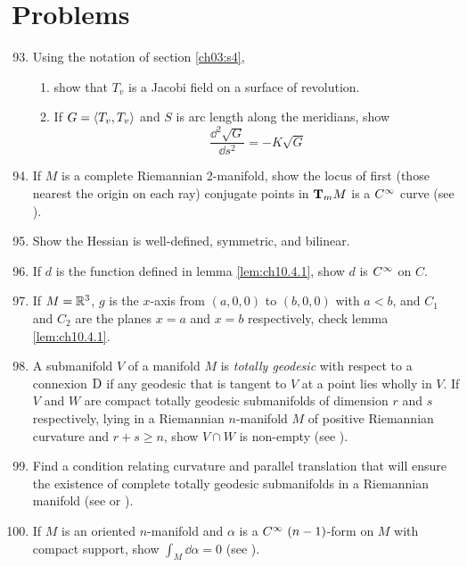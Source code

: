 \documentclass[../main]{subfiles}
\begin{document}
\section*{Problems}
\begin{enumerate}
\setcounter{enumi}{92}

\item\label{pro:93} Using the notation of section \ref{ch03:s4}, \begin{enumerate}
    \item show that $T_v$ is a Jacobi field on a surface of revolution.
    \item If $G=\ip{T_v}{T_v}$ and $S$ is arc length along the meridians, show
\[\frac{\dd^2\sqrt G}{\dd s^2}=-K\sqrt G\]

\end{enumerate} 
\item\label{pro:94} If $M$ is a complete Riemannian 2-manifold, show the locus of first (those nearest the origin on each ray) conjugate points in $\ts Mm$ is a $\CInfty$ curve (see \cite{myers1935connections}).

\item\label{pro:95} Show the Hessian is well-defined, symmetric, and bilinear.

\item\label{pro:96} If $d$ is the function defined in lemma \ref{lem:ch10.4.1}, show $d$ is $\CInfty$ on $C$.

\item\label{pro:97} If $M=\bR^3$, $g$ is the $x$-axis from $(a,0,0)$ to $(b,0,0)$ with $a<b$, and $C_1$ and $C_2$ are the planes $x=a$ and $x=b$ respectively, check lemma \ref{lem:ch10.4.1}.

\item\label{pro:98} A submanifold $V$ of a manifold $M$ is \emph{totally geodesic} with respect to a connexion $\D$ if any geodesic that is tangent to $V$ at a point lies wholly in $V$. If $V$ and $W$ are compact totally geodesic submanifolds of dimension $r$ and $s$ respectively, lying in a Riemannian $n$-manifold $M$ of positive Riemannian curvature and $r+s\ge n$, show $V\cap W$ is non-empty (see \cite{frankel1961Manifolds}).

\item\label{pro:99} Find a condition relating curvature and parallel translation that will ensure the existence of complete totally geodesic submanifolds in a Riemannian manifold (see  \cite{hermann1960existence} or  \cite{helgason2012differential}).

\item\label{pro:100} If $M$ is an oriented $n$-manifold and $\alpha$ is a $\CInfty~(n-1)$-form on $M$ with compact support, show $\int_M\dd\alpha=0$ (see \cite{nijenhuis1962a}).

\end{enumerate}
\end{document}
